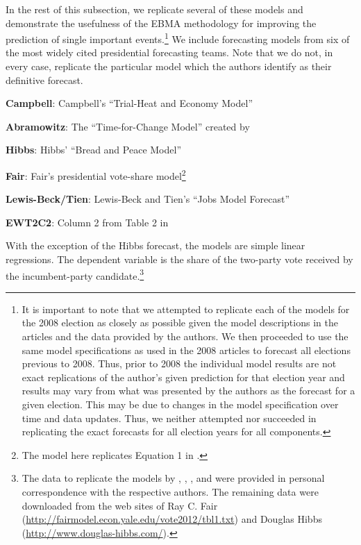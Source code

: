 \documentclass[12pt,fullpage,endnotes]{article}
\newcommand{\note}[1]{\footnote{ #1 \vspace{4 mm}}}
\begin{document}
In the rest of this subsection, we replicate several of these models
and demonstrate the usefulness of the EBMA methodology for improving
the prediction of single important events.\note{It is important to
  note that we attempted to replicate each of the models for the 2008
  election as closely as possible given the model descriptions in the
  articles and the data provided by the authors. We then proceeded to
  use the same model specifications as used in the 2008 articles to
  forecast all elections previous to 2008. Thus, prior to 2008 the
  individual model results are not exact replications of the author's
  given prediction for that election year and results may vary from
  what was presented by the authors as the forecast for a given
  election. This may be due to changes in the model specification over
  time and data updates.  Thus, we neither attempted nor succeeded in
  replicating the exact forecasts for all election years for all
  components.}  We include forecasting models from six of the most
widely cited presidential forecasting teams.  Note that we do not, in
every case, replicate the particular model which the authors identify
as their definitive forecast.
\begin{list}{}{\leftmargin=1em}
\item \textbf{Campbell}: Campbell's ``Trial-Heat and Economy Model''
  \citep{Campbell:2008}
\item \textbf{Abramowitz}: The ``Time-for-Change Model'' created by   \citet{Abramowitz:2008}
\item \textbf{Hibbs}: Hibbs' ``Bread and Peace Model'' \citep{Hibbs:2000}
\item \textbf{Fair}: Fair's presidential vote-share model\note{The model here replicates Equation 1 in \citet{Fair:2010}.}
\item \textbf{Lewis-Beck/Tien}: Lewis-Beck and Tien's ``Jobs Model Forecast'' \citep{Lewis-Beck:Tien:2008}
\item \textbf{EWT2C2}: Column 2 from Table 2 in \citet{Erikson:Wlezien:2008} 


\end{list}
\noindent With the exception of the Hibbs forecast, the models are
simple linear regressions. The dependent variable is the share of the
two-party vote received by the incumbent-party candidate.\note{The
  data to replicate the models by \citet{Abramowitz:2008},
  \citet{Campbell:2008}, \citet{Erikson:Wlezien:2008}, and
  \citet{Lewis-Beck:Tien:2008} were provided in personal
  correspondence with the respective authors.  The remaining data were
  downloaded from the web sites of Ray C. Fair \nocite{Fair2011} (\url{http://fairmodel.econ.yale.edu/vote2012/tbl1.txt}) and
  Douglas Hibbs \nocite{Hibbs2011} (\url{http://www.douglas-hibbs.com/}).}
\end{document}
